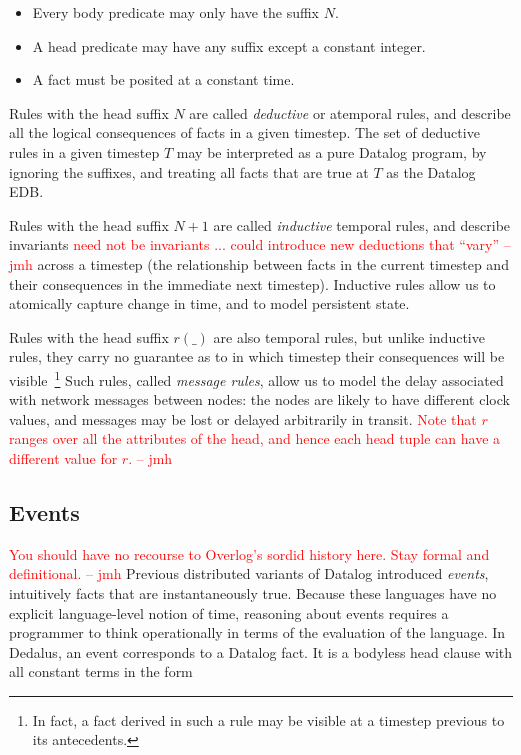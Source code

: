 \documentclass{acm_proc_article-sp-sigmod09}
\newcommand{\jmh}[1]{{\textcolor{red}{#1 -- jmh}}}
\begin{document}
\begin{itemize}
\item Every body predicate may only have the suffix $N$.
\item A head predicate may have any suffix except a constant integer.
\item A fact must be posited at a constant time.
\end{itemize}

Rules with the head suffix $N$ are called \emph{deductive} or atemporal rules,
and describe all the logical consequences of facts in a given timestep.  The
set of deductive rules in a given timestep $T$ may be interpreted as a pure
Datalog program, by ignoring the suffixes, and treating all facts that are true
at $T$ as the Datalog EDB.

Rules with the head suffix $N + 1$ are called \emph{inductive} temporal rules,
and describe invariants \jmh{need not be invariants ... could introduce new deductions that ``vary''} across a timestep (the relationship between facts in
the current timestep and their consequences in the immediate next timestep).
Inductive rules allow us to atomically capture change in time, and to model
persistent state.

Rules with the head suffix $r(\_)$ are also temporal rules, but unlike
inductive rules, they carry no guarantee as to in which timestep their
consequences will be visible~\footnote{In fact, a fact derived in such a rule
may be visible at a timestep previous to its antecedents.} Such rules, called
{\em message rules}, allow us to model the delay associated with network
messages between nodes: the nodes are likely to have different clock values,
and messages may be lost or delayed arbitrarily in transit.  \jmh{Note that $r$ ranges over all the attributes of the head, and hence each head tuple can have a different value for $r$.}


\subsection{Events}
\jmh{You should have no recourse to Overlog's sordid history here.  Stay formal and definitional.}
Previous distributed variants of Datalog introduced {\em events}, intuitively
facts that are instantaneously true.  Because these languages have no explicit
language-level notion of time, reasoning about events requires a programmer to
think operationally in terms of the evaluation of the language.  In Dedalus,
an event corresponds to a Datalog fact.  It is a bodyless head clause with all 
constant terms in the form
\end{document}
